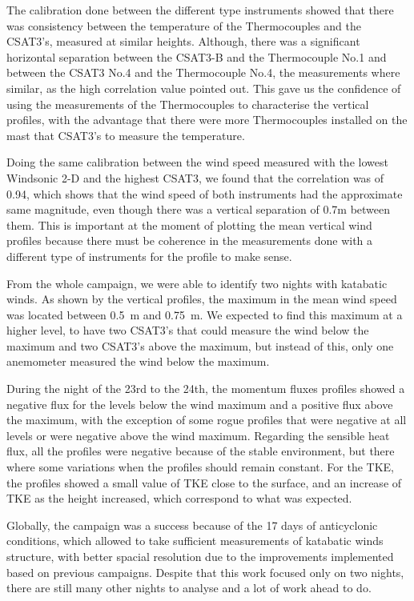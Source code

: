 The calibration done between the different type instruments showed that there was consistency between the temperature of the Thermocouples and the CSAT3's, measured at similar heights. Although, there was a significant horizontal separation between the CSAT3-B and the Thermocouple No.1 and between the CSAT3 No.4 and the Thermocouple No.4, the measurements where similar, as the high correlation value pointed out. This gave us the confidence of using the measurements of the Thermocouples to characterise the vertical profiles, with the advantage that there were more Thermocouples installed on the mast that CSAT3's to measure the temperature.

Doing the same calibration between the wind speed measured with the lowest Windsonic 2-D and the highest CSAT3, we found that the correlation was of 0.94, which shows that the wind speed of both instruments had the approximate same magnitude, even though there was a vertical separation of 0.7m between them. This is important at the moment of plotting the mean vertical wind profiles because there must be coherence in the measurements done with a different type of instruments for the profile to make sense. 

From the whole campaign, we were able to identify two nights with katabatic winds. As shown by the vertical profiles, the maximum in the mean wind speed was located between 0.5~m and 0.75~m. We expected to find this maximum at a higher level, to have two CSAT3's that could measure the wind below the maximum and two CSAT3's above the maximum, but instead of this, only one anemometer measured the wind below the maximum. 

During the night of the 23rd to the 24th, the momentum fluxes profiles showed a negative flux for the levels below the wind maximum and a positive flux above the maximum, with the exception of some rogue profiles that were negative at all levels or were negative above the wind maximum. Regarding the sensible heat flux, all the profiles were negative because of the stable environment, but there where some variations when the profiles should remain constant. For the TKE, the profiles showed a small value of TKE close to the surface, and an increase of TKE as the height increased, which correspond to what was expected. 

Globally, the campaign was a success because of the 17 days of anticyclonic conditions, which allowed to take sufficient measurements of katabatic winds structure, with better spacial resolution due to the improvements implemented based on previous campaigns. Despite that this work focused only on two nights, there are still many other nights to analyse and a lot of work ahead to do.